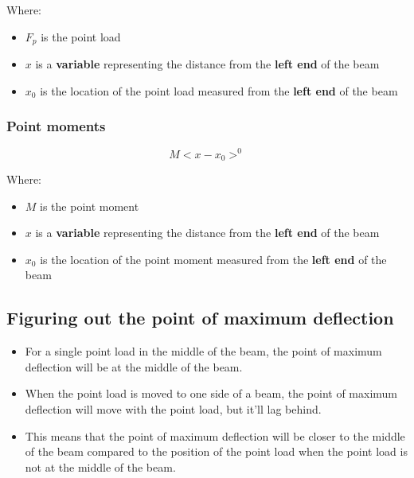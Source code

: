 \documentclass[11pt]{article}
\begin{document}
Where:
\begin{itemize}
\item \(F_p\) is the point load
\item \(x\) is a \textbf{variable} representing the distance from the \textbf{left end} of the beam
\item \(x_0\) is the location of the point load measured from the \textbf{left end} of the beam
\end{itemize}
\subsubsection{Point moments}
\label{sec:org35da956}
\[M < x - x_0 >^0\]

Where:
\begin{itemize}
\item \(M\) is the point moment
\item \(x\) is a \textbf{variable} representing the distance from the \textbf{left end} of the beam
\item \(x_0\) is the location of the point moment measured from the \textbf{left end} of the beam
\end{itemize}
\subsection{Figuring out the point of maximum deflection}
\label{sec:org622bbac}
\begin{itemize}
\item For a single point load in the middle of the beam, the point of maximum deflection will be at the middle of the beam.
\item When the point load is moved to one side of a beam, the point of maximum deflection will move with the point load, but it'll lag behind.
\item This means that the point of maximum deflection will be closer to the middle of the beam compared to the position of the point load when the point load is not at the middle of the beam.
\end{itemize}

\newpage
\end{document}
